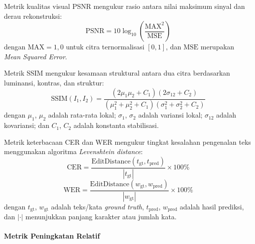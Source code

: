Metrik kualitas visual PSNR mengukur rasio antara nilai maksimum sinyal dan derau rekonstruksi:
\begin{equation}
  \text{PSNR} = 10 \log_{10}\left(\frac{\text{MAX}^2}{\text{MSE}}\right)
  \label{eq:IV.17}
\end{equation}
dengan $\text{MAX}=1,0$ untuk citra ternormalisasi $[0,1]$, dan $\text{MSE}$ merupakan \textit{Mean Squared Error}.

Metrik SSIM mengukur kesamaan struktural antara dua citra berdasarkan luminansi, kontras, dan struktur:
\begin{equation}
  \text{SSIM}(I_1, I_2) = \frac{(2\mu_1\mu_2 + C_1)(2\sigma_{12} + C_2)}{(\mu_1^2 + \mu_2^2 + C_1)(\sigma_1^2 + \sigma_2^2 + C_2)}
  \label{eq:IV.18}
\end{equation}
dengan $\mu_1$, $\mu_2$ adalah rata-rata lokal; $\sigma_1$, $\sigma_2$ adalah variansi lokal; $\sigma_{12}$ adalah kovariansi; dan $C_1$, $C_2$ adalah konstanta stabilisasi.

Metrik keterbacaan CER dan WER mengukur tingkat kesalahan pengenalan teks menggunakan algoritma \textit{Levenshtein distance}:
\begin{equation}
  \text{CER} = \frac{\text{EditDistance}(t_{\text{gt}}, t_{\text{pred}})}{|t_{\text{gt}}|} \times 100\%
  \label{eq:IV.19}
\end{equation}
\begin{equation}
  \text{WER} = \frac{\text{EditDistance}(w_{\text{gt}}, w_{\text{pred}})}{|w_{\text{gt}}|} \times 100\%
  \label{eq:IV.20}
\end{equation}
dengan $t_{\text{gt}}$, $w_{\text{gt}}$ adalah teks/kata \textit{ground truth}, $t_{\text{pred}}$, $w_{\text{pred}}$ adalah hasil prediksi, dan $|\cdot|$ menunjukkan panjang karakter atau jumlah kata.

\paragraph{Metrik Peningkatan Relatif}

